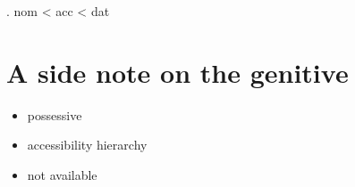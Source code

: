 \ex. \ac{nom} < \ac{acc} < \ac{dat}

\phantom{nom}




\section{A side note on the genitive}\label{sec:genitive}

\begin{itemize}
  \item possessive
  \item accessibility hierarchy
  \item not available
\end{itemize}
